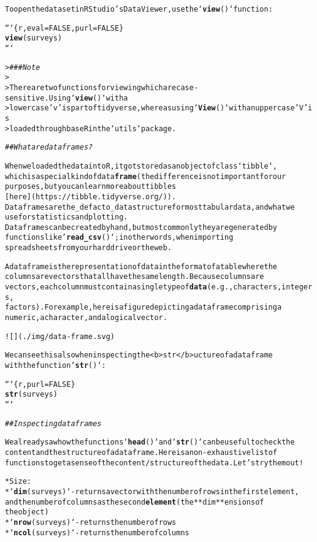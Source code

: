 \documentclass{article}\usepackage[]{graphicx}\usepackage[]{xcolor}
\makeatletter
\newcommand{\hlstr}[1]{\textcolor[rgb]{0.192,0.494,0.8}{#1}}%
\newcommand{\hlcom}[1]{\textcolor[rgb]{0.678,0.584,0.686}{\textit{#1}}}%
\newcommand{\hlkwd}[1]{\textcolor[rgb]{0.737,0.353,0.396}{\textbf{#1}}}%
\newenvironment{kframe}{%
 \def\at@end@of@kframe{}%
 \ifinner\ifhmode%
  \def\at@end@of@kframe{\end{minipage}}%
  \begin{minipage}{\columnwidth}%
 \fi\fi%
 \def\FrameCommand##1{\hskip\@totalleftmargin \hskip-\fboxsep
 \colorbox{shadecolor}{##1}\hskip-\fboxsep
     \hskip-\linewidth \hskip-\@totalleftmargin \hskip\columnwidth}%
 \MakeFramed {\advance\hsize-\width
   \@totalleftmargin\z@ \linewidth\hsize
   \@setminipage}}%
 {\par\unskip\endMakeFramed%
 \at@end@of@kframe}
\newenvironment{knitrout}{}{} %
\makeatother
\begin{document}
\begin{knitrout}
\begin{kframe}
\begin{alltt}
To open the dataset in RStudio's Data Viewer, use the `\hlkwd{view}()` function:

```\{r, eval = FALSE, purl = FALSE\}
\hlkwd{view}(surveys)
```

> \hlcom{### Note}
> 
>  There are two functions for viewing which are case-sensitive. Using `\hlkwd{view}()` with a 
>  lowercase \hlstr{'v'} is part of tidyverse, whereas using `\hlkwd{View}()` with an uppercase \hlstr{'V'} is 
>  loaded through base R in the `utils` package.



\hlcom{## What are data frames?}

When we loaded the data into R, it got stored as an object of class `tibble`, 
which is a special kind of data \hlkwd{frame} (the difference is not important for our 
purposes, but you can learn more about tibbles 
[here](https://tibble.tidyverse.org/)). 
Data frames are the _de facto_ data structure for most tabular data, and what we
use for statistics and plotting.
Data frames can be created by hand, but most commonly they are generated by
functions like `\hlkwd{read_csv}()`; in other words, when importing
spreadsheets from your hard drive or the web.

A data frame is the representation of data in the format of a table where the
columns are vectors that all have the same length. Because columns are
vectors, each column must contain a single type of \hlkwd{data} (e.g., characters, integers,
factors). For example, here is a figure depicting a data frame comprising a
numeric, a character, and a logical vector.

![](./img/data-frame.svg)

We can see this also when inspecting the <b>str</b>ucture of a data frame
with the function `\hlkwd{str}()`:

```\{r, purl=FALSE\}
\hlkwd{str}(surveys)
```
 
\hlcom{## Inspecting data frames}

We already saw how the functions `\hlkwd{head}()` and `\hlkwd{str}()` can be useful to check the
content and the structure of a data frame. Here is a non-exhaustive list of
functions to get a sense of the content/structure of the data. Let's try them out!

* Size:
    * `\hlkwd{dim}(surveys)` - returns a vector with the number of rows in the first element,
          and the number of columns as the second \hlkwd{element} (the **dim**ensions of
          the object)
    * `\hlkwd{nrow}(surveys)` - returns the number of rows
    * `\hlkwd{ncol}(surveys)` - returns the number of columns


\end{alltt}
\end{kframe}
\end{knitrout}
\end{document}
